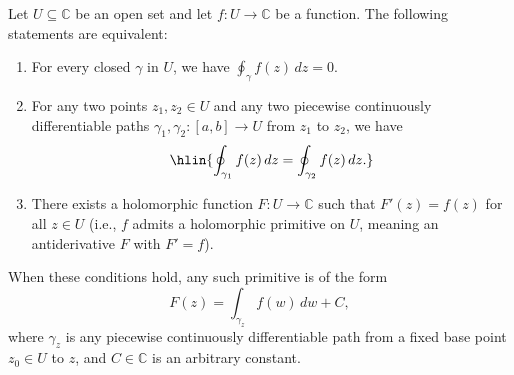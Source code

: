 \begin{proposition} \label{proposition:contour_integral_of_a_complex_valued_functions_along_a_piecewise_continuously_differentiable_path_is_invariant_under_reparametrization_is_path_independent}
Let $U \subseteq \mathbb{C}$ be an open set and let $f : U \to \mathbb{C}$ be a  function. The following statements are equivalent:

\begin{enumerate}
    \item[(i)] For every closed  $\gamma$ in $U$, we have $\displaystyle\oint_{\gamma} f(z)\,dz = 0$.

    \item[(ii)] For any two points $z_1, z_2 \in U$ and any two piecewise continuously differentiable paths $\gamma_1, \gamma_2 : [a,b] \to U$ from $z_1$ to $z_2$, we have
    $$\hlin{\oint_{\gamma_1} f(z)\,dz = \oint_{\gamma_2} f(z)\,dz.}$$

    \item[(iii)] There exists a holomorphic function $F : U \to \mathbb{C}$ such that $F'(z) = f(z)$ for all $z \in U$ (i.e., $f$ admits a holomorphic primitive on $U$, meaning an antiderivative $F$ with $F' = f$).
\end{enumerate}

When these conditions hold, any such primitive is of the form
$$F(z) = \int_{\gamma_z} f(w)\,dw + C,$$
where $\gamma_z$ is any piecewise continuously differentiable path from a fixed base point $z_0 \in U$ to $z$, and $C \in \mathbb{C}$ is an arbitrary constant.
\end{proposition}

